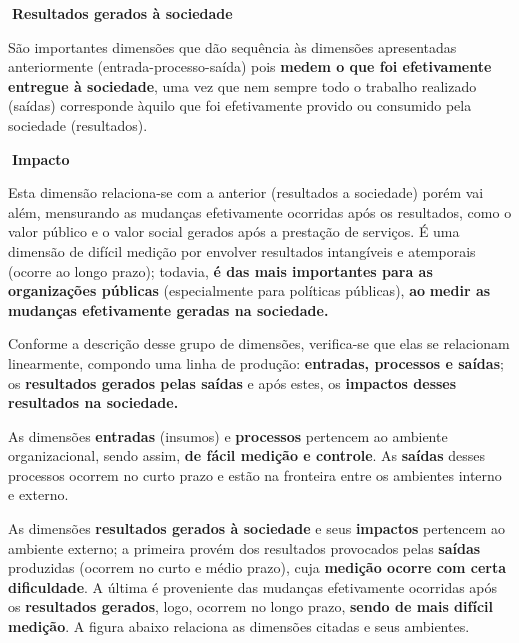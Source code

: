 \documentclass[
  letterpaper,
  DIV=11,
  numbers=noendperiod]{scrreprt}
\begin{document}
\begin{tcolorbox}[enhanced jigsaw, opacityback=0, toprule=.15mm, breakable, leftrule=.75mm, rightrule=.15mm, left=2mm, colback=white, arc=.35mm, bottomrule=.15mm]

\textbf{🔽{Resultados gerados à sociedade}}\vspace{2mm}

São importantes dimensões que dão sequência às dimensões apresentadas
anteriormente (entrada-processo-saída) pois \textbf{medem o que foi
efetivamente entregue à sociedade}, uma vez que nem sempre todo o
trabalho realizado (saídas) corresponde àquilo que foi efetivamente
provido ou consumido pela sociedade (resultados).

\end{tcolorbox}

\begin{tcolorbox}[enhanced jigsaw, opacityback=0, toprule=.15mm, breakable, leftrule=.75mm, rightrule=.15mm, left=2mm, colback=white, arc=.35mm, bottomrule=.15mm]

\textbf{🔽{Impacto}}\vspace{2mm}

Esta dimensão relaciona-se com a anterior (resultados a sociedade) porém
vai além, mensurando as mudanças efetivamente ocorridas após os
resultados, como o valor público e o valor social gerados após a
prestação de serviços. É uma dimensão de difícil medição por envolver
resultados intangíveis e atemporais (ocorre ao longo prazo); todavia,
\textbf{é das mais importantes para as organizações públicas}
(especialmente para políticas públicas), \textbf{ao} \textbf{medir as
mudanças efetivamente geradas na sociedade.}

\end{tcolorbox}

Conforme a descrição desse grupo de dimensões, verifica-se que elas se
relacionam linearmente, compondo uma linha de produção:
\textbf{entradas, processos e saídas}; os \textbf{resultados gerados
pelas saídas} e após estes, os \textbf{impactos desses resultados na
sociedade.}

As dimensões \textbf{entradas} (insumos) e \textbf{processos} pertencem
ao ambiente organizacional, sendo assim, \textbf{de fácil medição e
controle}. As \textbf{saídas} desses processos ocorrem no curto prazo e
estão na fronteira entre os ambientes interno e externo.

As dimensões \textbf{resultados gerados à sociedade} e seus
\textbf{impactos} pertencem ao ambiente externo; a primeira provém dos
resultados provocados pelas \textbf{saídas} produzidas (ocorrem no curto
e médio prazo), cuja \textbf{medição ocorre com certa dificuldade}. A
última é proveniente das mudanças efetivamente ocorridas após os
\textbf{resultados gerados}, logo, ocorrem no longo prazo, \textbf{sendo
de mais difícil medição}. A figura abaixo relaciona as dimensões citadas
e seus ambientes.
\end{document}
